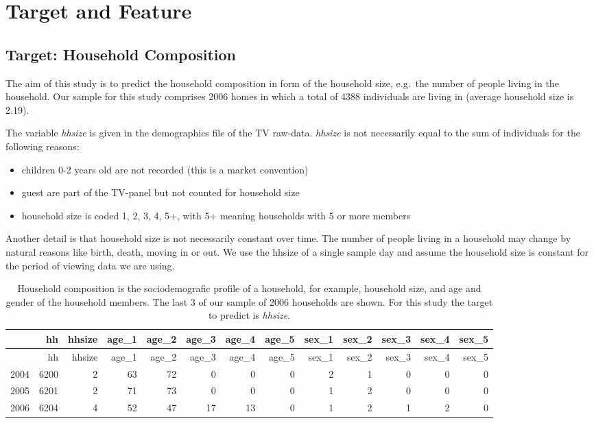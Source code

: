 \documentclass[]{article}
\providecommand{\tightlist}{%
  \setlength{\itemsep}{0pt}\setlength{\parskip}{0pt}}
\begin{document}
\hypertarget{target-and-feature}{%
\section{Target and Feature}\label{target-and-feature}}

\hypertarget{target-household-composition}{%
\subsection{Target: Household
Composition}\label{target-household-composition}}

The aim of this study is to predict the household composition in form of
the household size, e.g.~the number of people living in the household.
Our sample for this study comprises 2006 homes in which a total of 4388
individuals are living in (average household size is 2.19).

The variable \emph{hhsize} is given in the demographics file of the TV
raw-data. \emph{hhsize} is not necessarily equal to the sum of
individuals for the following reasons:

\begin{itemize}
\tightlist
\item
  children 0-2 years old are not recorded (this is a market convention)
\item
  guest are part of the TV-panel but not counted for household size
\item
  household size is coded 1, 2, 3, 4, 5+, with 5+ meaning households
  with 5 or more members
\end{itemize}

Another detail is that household size is not necessarily constant over
time. The number of people living in a household may change by natural
reasons like birth, death, moving in or out. We use the hhsize of a
single sample day and assume the household size is constant for the
period of viewing data we are using.

\begin{longtable}[]{@{}lrrrrrrrrrrrr@{}}
\caption{Household composition is the sociodemografic profile of a
household, for example, household size, and age and gender of the
household members. The last 3 of our sample of 2006 households are
shown. For this study the target to predict is
\emph{hhsize}.}\tabularnewline
\toprule
& hh & hhsize & age\_1 & age\_2 & age\_3 & age\_4 & age\_5 & sex\_1 &
sex\_2 & sex\_3 & sex\_4 & sex\_5\tabularnewline
\midrule
\endfirsthead
\toprule
& hh & hhsize & age\_1 & age\_2 & age\_3 & age\_4 & age\_5 & sex\_1 &
sex\_2 & sex\_3 & sex\_4 & sex\_5\tabularnewline
\midrule
\endhead
2004 & 6200 & 2 & 63 & 72 & 0 & 0 & 0 & 2 & 1 & 0 & 0 & 0\tabularnewline
2005 & 6201 & 2 & 71 & 73 & 0 & 0 & 0 & 1 & 2 & 0 & 0 & 0\tabularnewline
2006 & 6204 & 4 & 52 & 47 & 17 & 13 & 0 & 1 & 2 & 1 & 2 &
0\tabularnewline
\bottomrule
\end{longtable}
\end{document}
